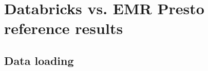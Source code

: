 \section{Databricks vs. EMR Presto reference results}\label{referenceResults}

\subsection{Data loading}\label{referenceResultsDataLoading}